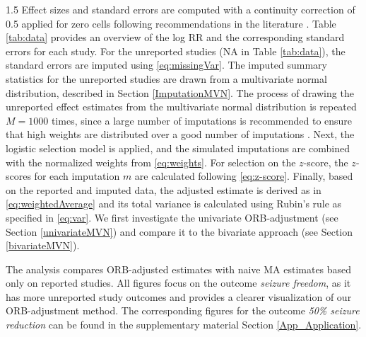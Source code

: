 \documentclass{article}
\begin{document}
\begin{spacing}{1.5}
Effect sizes and standard errors are computed with a continuity correction of 0.5 applied for zero cells following recommendations in the literature \cite{copas2019model, agresti2013categorical}. Table \ref{tab:data} provides an overview of the log RR and the corresponding standard errors for each study. For the unreported studies (NA in Table \ref{tab:data}), the standard errors are imputed using \eqref{eq:missingVar}. The imputed summary statistics for the unreported studies are drawn from a multivariate normal distribution, described in Section \ref{ImputationMVN}. The process of drawing the unreported effect estimates from the multivariate normal distribution is repeated $M = 1000$ times, since a large number of imputations is recommended to ensure that high weights are distributed over a good number of imputations \cite{carpenter2011assessing}. Next, the logistic selection model is applied, and the simulated imputations are combined with the normalized weights from \eqref{eq:weights}. For selection on the $z$-score, the $z$-scores for each imputation $m$ are calculated following \eqref{eq:z-score}. Finally, based on the reported and imputed data, the adjusted estimate is derived as in \eqref{eq:weightedAverage} and its total variance is calculated using Rubin's rule as specified in \eqref{eq:var}. We first investigate the univariate ORB-adjustment (see Section \ref{univariateMVN}) and compare it to the bivariate approach (see Section \ref{bivariateMVN}).

The analysis compares ORB-adjusted estimates with naive MA estimates based only on reported studies. All figures focus on the outcome \textit{seizure freedom}, as it has more unreported study outcomes and provides a clearer visualization of our ORB-adjustment method. The corresponding figures for the outcome \textit{50\% seizure reduction} can be found in the supplementary material Section \ref{App_Application}.


\end{spacing}
\end{document}
